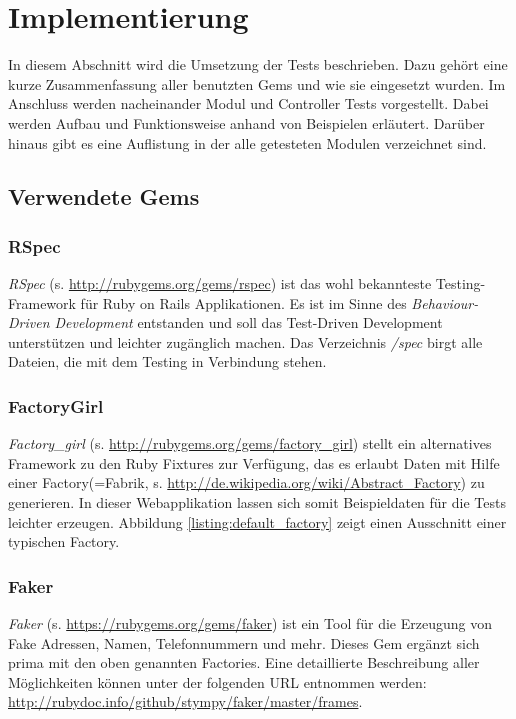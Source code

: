 \documentclass[12pt,             %
               a4paper,          %
               listof=totoc,     %
               index=totoc,      %
               bibliography=totoc,%
               oneside,         %
               BCOR1cm,          %
               english   %
               ]{scrbook}
\begin{document}
\section{Implementierung}
In diesem Abschnitt wird die Umsetzung der Tests beschrieben. Dazu gehört eine kurze Zusammenfassung aller benutzten Gems und wie sie eingesetzt wurden. Im Anschluss werden nacheinander Modul und Controller Tests vorgestellt. Dabei werden Aufbau und Funktionsweise anhand von Beispielen erläutert. Darüber hinaus gibt es eine Auflistung in der alle getesteten Modulen verzeichnet sind.
\subsection{Verwendete Gems}
\subsubsection{RSpec}
\textit{RSpec} (s. \url{http://rubygems.org/gems/rspec}) ist das wohl bekannteste Testing-Framework für Ruby on Rails Applikationen. Es ist im Sinne des \textit{Behaviour-Driven Development} entstanden und soll das Test-Driven Development unterstützen und leichter zugänglich machen. Das Verzeichnis \textit{/spec} birgt alle Dateien, die mit dem Testing in Verbindung stehen.

\subsubsection{FactoryGirl}
\textit{Factory\_girl} (s. \url{http://rubygems.org/gems/factory_girl}) stellt ein alternatives Framework zu den Ruby Fixtures zur Verfügung, das es erlaubt Daten mit Hilfe einer \glqq Factory\grqq (=Fabrik, s. \url{http://de.wikipedia.org/wiki/Abstract_Factory}) zu generieren. In dieser Webapplikation lassen sich somit Beispieldaten für die Tests leichter erzeugen. Abbildung \vref{listing:default_factory} zeigt einen Ausschnitt einer typischen Factory.  

\label{listing:default_factory}

\subsubsection{Faker}
\textit{Faker} (s. \url{https://rubygems.org/gems/faker}) ist ein Tool für die Erzeugung von Fake Adressen, Namen, Telefonnummern und mehr. Dieses Gem ergänzt sich prima mit den oben genannten Factories. Eine detaillierte Beschreibung aller Möglichkeiten können unter der folgenden URL entnommen werden: \url{http://rubydoc.info/github/stympy/faker/master/frames}.
\end{document}
